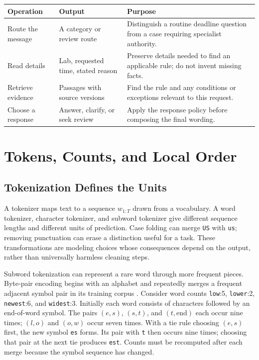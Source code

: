 \par\addvspace{\intextsep}\noindent\begin{minipage}{\linewidth}
\centering
\setlength{\tabcolsep}{3pt}
\renewcommand{\arraystretch}{1.12}
\begin{tabular}{@{}>{\raggedright\arraybackslash}p{2.1cm}>{\raggedright\arraybackslash}p{2.4cm}>{\raggedright\arraybackslash}p{5.5cm}@{}}
\toprule
Operation & Output & Purpose \\
\midrule
Route the message & A category or review route & Distinguish a routine deadline question from a case requiring specialist authority. \\
Read details & Lab, requested time, stated reason & Preserve details needed to find an applicable rule; do not invent missing facts. \\
Retrieve evidence & Passages with source versions & Find the rule and any conditions or exceptions relevant to this request. \\
Choose a response & Answer, clarify, or seek review & Apply the response policy before composing the final wording. \\
\bottomrule
\end{tabular}
\label{tab:course-support-workflow}
\end{minipage}\par\addvspace{\intextsep}

\section{Tokens, Counts, and Local Order}

\subsection{Tokenization Defines the Units}

A tokenizer maps text to a sequence $w_{1:T}$ drawn from a vocabulary. A word tokenizer, character tokenizer, and subword tokenizer give different sequence lengths and different units of prediction. Case folding can merge \texttt{US} with \texttt{us}; removing punctuation can erase a distinction useful for a task. These transformations are modeling choices whose consequences depend on the output, rather than universally harmless cleaning steps.

Subword tokenization can represent a rare word through more frequent pieces. Byte-pair encoding begins with an alphabet and repeatedly merges a frequent adjacent symbol pair in its training corpus \citep{sennrich2016subword}. Consider word counts \texttt{low}:5, \texttt{lower}:2, \texttt{newest}:6, and \texttt{widest}:3. Initially each word consists of characters followed by an end-of-word symbol. The pairs $(e,s)$, $(s,t)$, and $(t,\text{end})$ each occur nine times; $(l,o)$ and $(o,w)$ occur seven times. With a tie rule choosing $(e,s)$ first, the new symbol \texttt{es} forms. Its pair with \texttt{t} then occurs nine times; choosing that pair at the next tie produces \texttt{est}. Counts must be recomputed after each merge because the symbol sequence has changed.

